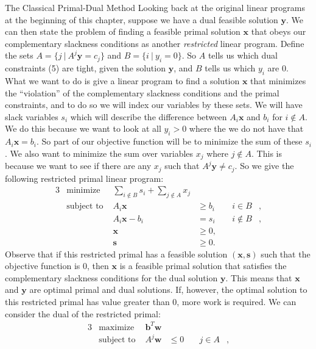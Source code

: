 \begin{section}{The Classical Primal-Dual Method}
	Looking back at the original linear programs at the beginning of this chapter, suppose we have 
	a dual feasible solution $\mathbf{y}$. We can then state the problem of finding a feasible 
	primal solution $\mathbf{x}$ that obeys our complementary slackness conditions as another 
	\emph{restricted} linear program. Define the sets $A = \{j\ |\ A^{j}\mathbf{y} = c_j\}$ and 
	$B = \{i\ |\ y_i = 0\}$. So $A$ tells us which dual constraints (5) are tight, 
	given the solution $\mathbf{y}$, and $B$ tells us which $y_i$ are 0. What we want to do is 
	give a linear program to find a solution $\mathbf{x}$ that minimizes the 
	``violation'' of the complementary slackness conditions and the primal constraints, and to do 
	so we will index our variables by these sets. We will 
	have slack variables $s_i$ which will describe the difference between $A_i\mathbf{x}$ and $b_i$ 
	for $i\notin A$. We do this because we want to look at all $y_i > 0$ where the we do not 
	have that $A_i\mathbf{x} = b_i$. So part of our objective function will be to minimize the 
	sum of these $s_i$. We also want to minimize the sum over variables $x_j$ where $j\notin A$. 
	This is because we want to see if there are any $x_j$ such that $A^{j}\mathbf{y} \neq c_j$. 
	So we give the following restricted primal linear program:
	\begin{alignat}{3}
		& \text{minimize } & \sum_{i\notin B} s_i + \sum_{j\notin A} x_j & \\
		& \text{subject to } & A_i\mathbf{x} & \geq b_i & \quad i\in B &, \\
				     && A_i\mathbf{x} - b_i & = s_i & \quad i\notin B &, \\
				     && \mathbf{x} & \geq 0, \\
				     && \mathbf{s} & \geq 0.
	\end{alignat}
	Observe that if this restricted primal has a feasible solution $(\mathbf{x},\mathbf{s})$ such 
	that the objective function is 0, then $\mathbf{x}$ is a feasible primal solution that 
	satisfies the complementary slackness conditions for the dual solution $\mathbf{y}$. This 
	means that $\mathbf{x}$ and $\mathbf{y}$ are optimal primal and dual solutions. If, however, 
	the optimal solution to this restricted primal has value greater than 0, more work is required. 
	We can consider the dual of the restricted primal:
	\begin{alignat}{3}
		& \text{maximize } & \mathbf{b}^{T}\mathbf{w} & \\
		& \text{subject to } & A^{j}\mathbf{w} & \leq 0 & \quad j\in A &, \\

\end{alignat}
\end{section}
